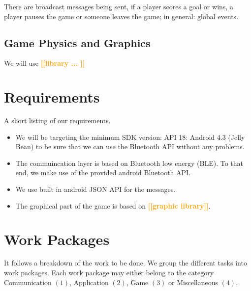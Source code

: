 \documentclass{report}
\newcommand{\todo}[1]{\textsf{\textbf{\textcolor{orange}{[[#1]]}}}}
\begin{document}
There are broadcast messages being sent, if a player scores a goal or wins, a player pauses the game or someone leaves the game; in general: global events.

\subsection{Game Physics and Graphics} We will use \todo{library ... } 

\section{Requirements}
A short listing of our requirements.

\begin{itemize}
        \item We will be targeting the minimum SDK version: API 18: Android 4.3 (Jelly Bean) to be sure that we can use the Bluetooth API without any problems.
        \item The commuincation layer is based on Bluetooth low energy (BLE). To that end, we make use of the provided android Bluetooth API.
        \item We use built in android JSON API for the messages.
        \item The graphical part of the game is based on \todo{graphic library}.
\end{itemize}

\section{Work Packages}
It follows a breakdown of the work to be done. We group the different tasks into work packages. Each work package may either belong to the category Communication $(1)$, Application $(2)$, Game $(3)$ or Miscellaneous $(4)$.
\end{document}
